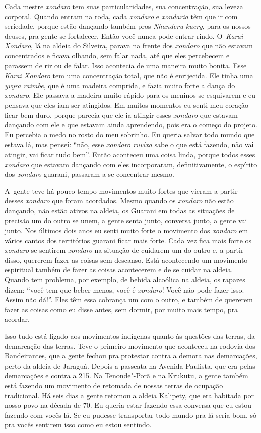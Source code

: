 Cada mestre \emph{xondaro} tem suas particularidades, sua concentração, sua
leveza corporal. Quando entram na roda, cada \emph{xondaro} e \emph{xondaria} têm que
ir com seriedade, porque estão dançando também pros \emph{Nhanderu kuery}, para
os nossos deuses, pra gente se fortalecer. Então você nunca pode entrar
rindo. O~\emph{Karai Xondaro}, lá na aldeia do Silveira, parava na frente dos
\emph{xondaro} que não estavam concentrados e ficava olhando, sem falar nada,
até que eles percebecem e parassem de rir ou de falar. Isso acontecia
de uma maneira muito bonita. Esse \emph{Karai Xondaro} tem uma concentração
total, que não é enrijecida. Ele tinha uma \emph{yvyra raimbe}, que é uma
madeira comprida, e fazia muito forte a dança do \emph{xondaro}. Ele passava a
madeira muito rápido para os meninos se esquivarem e eu pensava que
eles iam ser atingidos. Em muitos momentos eu senti meu coração ficar
bem duro, porque parecia que ele ia atingir esses \emph{xondaro} que estavam
dançando com ele e que estavam ainda aprendendo, pois era o começo do
projeto. Eu percebia o medo no rosto do meu sobrinho. Eu queria salvar
todo mundo que estava lá, mas pensei: ``não, esse \emph{xondaro ruvixa} sabe o
que está fazendo, não vai atingir, vai ficar tudo bem''. Então aconteceu
uma coisa linda, porque todos esses \emph{xondaro} que estavam dançando com
eles incorporaram, definitivamente, o espírito dos \emph{xondaro} guarani,
passaram a se concentrar mesmo.

A~gente teve há pouco tempo movimentos muito fortes que vieram a partir
desses \emph{xondaro} que foram acordados. Mesmo quando os \emph{xondaro} não estão
dançando, não estão ativos na aldeia, os Guarani em todas as situações
de precisão um do outro se unem, a gente senta junto, conversa junto, a
gente vai junto. Nos últimos dois anos eu senti muito forte o movimento
dos \emph{xondaro} em vários cantos dos territórios guarani ficar mais forte.
Cada vez fica mais forte os \emph{xondaro} se sentirem \emph{xondaro} na situação de
cuidarem um do outro e, a partir disso, quererem fazer as coisas sem
descanso. Está acontecendo um movimento espiritual também de fazer as
coisas acontecerem e de se cuidar na aldeia. Quando tem problema, por
exemplo, de bebida alcoólica na aldeia, os rapazes dizem: ``você tem que
beber menos, você é \emph{xondaro}! Você não pode fazer isso. Assim não dá!''.
Eles têm essa cobrança um com o outro, e também de quererem fazer as
coisas como eu disse antes, sem dormir, por muito mais tempo, pra
acordar.

Isso tudo está ligado aos movimentos indígenas quanto às questões das
terras, da demarcação das terras. Teve o primeiro movimento que
aconteceu na rodovia dos Bandeirantes, que a gente fechou pra protestar
contra a demora nas demarcações, perto da aldeia de Jaraguá. Depois a
passeata na Avenida Paulista, que era pelas demarcações e contra a 
215. Na Tenonde"-Porã e na Krukutu, a gente também está fazendo um
movimento de retomada de nossas terras de ocupação tradicional. Há seis
dias a gente retomou a aldeia Kalipety, que era habitada por nosso povo
na década de 70. Eu queria estar fazendo essa conversa que eu estou
fazendo com vocês lá. Se eu pudesse transportar todo mundo pra lá seria
bom, só pra vocês sentirem isso como eu estou sentindo.

